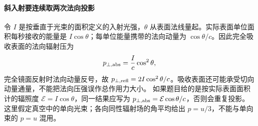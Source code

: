 \paragraph{斜入射要连续取两次法向投影}
令 $I$ 是按垂直于光束的面积定义的入射光强，$\theta$ 从表面法线量起。实际表面单位面积每秒接收的能量是 $I\cos\theta$；每单位能量携带的法向动量为 $\cos\theta/c$。因此完全吸收表面的法向辐射压为
\[
 p_{\perp,\rm abs}=\frac I c\cos^2\theta,
\]
完全镜面反射时法向动量反号，故 $p_{\perp,\rm refl}=2I\cos^2\theta/c$。吸收表面还可能承受切向动量通量，不能把法向压强误作总作用力大小。
如果题目给的是按实际表面面积计的辐照度 $\mathcal E=I\cos\theta$，同一结果应写为 $p_{\perp,\rm abs}=\mathcal E\cos\theta/c$，否则会重复投影。这里假定真空中的单向光束；各向同性辐射场的角平均给出 $p=u/3$，不能与单向束的 $p=u$ 混用。
